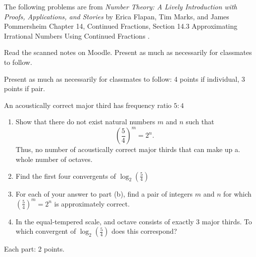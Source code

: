 \documentclass[letterpaper, 11 pt,handout,hints]{ximera}
\begin{document}
\begin{exploration}
The following problems are from \emph{Number Theory: A Lively Introduction with Proofs, Applications, and Stories} by Erica Flapan, Tim Marks, and James Pommersheim Chapter 14, Continued Fractions, Section 14.3 Approximating Irrational Numbers Using Continued Fractions \cite{theo}.

	Read the scanned notes on Moodle. Present as much as necessarily for classmates to follow.
	
\begin{rubric}
 Present as much as necessarily for classmates to follow: 4 points if individual, 3 points if pair.
\end{rubric}

\begin{problem}
	An acoustically correct major third has frequency ratio $5:4$ 
	\begin{enumerate}
 		\item Show that there do not exist natural numbers $m$ and $n$ such that \[\left(\frac{5}{4}\right)^m=2^n.\]
		Thus, no number of acoustically correct major thirds that can make up a. whole number of octaves. 
		\item Find the first four convergents of $\log_2\left(\frac{5}{4}\right)$
		\item For each of your answer to part (b), find a pair of integers $m$ and $n$ for which $\left(\frac{5}{4}\right)^m=2^n$ is approximately correct.
		\item In the equal-tempered scale, and octave consists of exactly 3 major thirds. To which convergent of $\log_2\left(\frac{5}{4}\right)$ does this correspond?

	\end{enumerate}
\begin{rubric}
Each part: 2 points.
\end{rubric}
\end{problem}
\end{exploration}
\end{document}

